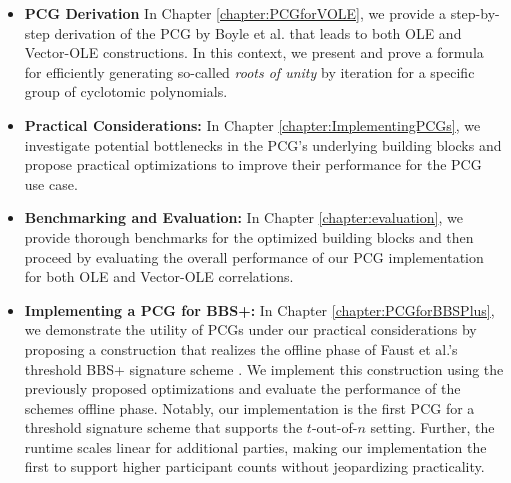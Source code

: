 \begin{itemize}
\item \textbf{PCG Derivation} In Chapter \ref{chapter:PCGforVOLE}, we provide a step-by-step derivation of the PCG by Boyle et al. that leads to both OLE and Vector-OLE constructions. In this context, we present and prove a formula for efficiently generating so-called \textit{roots of unity} by iteration for a specific group of cyclotomic polynomials.
\item \textbf{Practical Considerations:} In Chapter \ref{chapter:ImplementingPCGs}, we investigate potential bottlenecks in the PCG's underlying building blocks and propose practical optimizations to improve their performance for the PCG use case.
\item \textbf{Benchmarking and Evaluation:} In Chapter \ref{chapter:evaluation}, we provide thorough benchmarks for the optimized building blocks and then proceed by evaluating the overall performance of our PCG implementation for both OLE and Vector-OLE correlations.
\item \textbf{Implementing a PCG for BBS+:} In Chapter \ref{chapter:PCGforBBSPlus}, we demonstrate the utility of PCGs under our practical considerations by proposing a construction that realizes the offline phase of Faust et al.'s threshold BBS+ signature scheme \cite{faust2023non}. We implement this construction using the previously proposed optimizations and evaluate the performance of the schemes offline phase. Notably, our implementation is the first PCG for a threshold signature scheme that supports the $t$-out-of-$n$ setting. Further, the runtime scales linear for additional parties, making our implementation the first to support higher participant counts without jeopardizing practicality.
\end{itemize}

